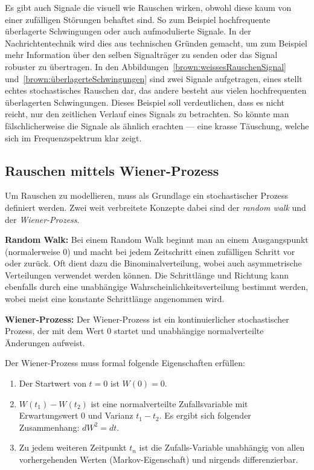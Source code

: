 Es gibt auch Signale die visuell wie Rauschen wirken, obwohl diese kaum von einer zufälligen Störungen behaftet sind. So zum Beispiel hochfrequente überlagerte Schwingungen oder auch aufmodulierte Signale. In der Nachrichtentechnik wird dies aus technischen Gründen gemacht, um zum Beispiel mehr Information über den selben Signalträger zu senden oder das Signal robuster zu übertragen. In den Abbildungen~\ref{brown:weissesRauschenSignal} und~\ref{brown:überlagerteSchwingungen} sind zwei Signale aufgetragen, eines stellt echtes stochastisches Rauschen dar, das andere besteht aus vielen hochfrequenten überlagerten Schwingungen. Dieses Beispiel soll verdeutlichen, dass es nicht reicht, nur den zeitlichen Verlauf eines Signals zu betrachten. So könnte man fälschlicherweise die Signale als ähnlich erachten --- eine krasse Täuschung, welche sich im Frequenzspektrum klar zeigt. 



\subsection{Rauschen mittels Wiener-Prozess\label{brown:Rauschen:RandomWalkWiener}}

Um Rauschen zu modellieren, muss als Grundlage ein stochastischer Prozess definiert werden. Zwei weit verbreitete Konzepte dabei sind der \textit{random walk} und der \textit{Wiener-Prozess}.

\begin{definition}\textbf{Random Walk:}
	\label{randomWalk}
	Bei einem Random Walk beginnt man an einem Ausgangspunkt (normalerweise 0) und macht bei jedem Zeitschritt einen zufälligen Schritt vor oder zurück. Oft dient dazu die Binominalverteilung, wobei auch asymmetrische Verteilungen verwendet werden können. Die Schrittlänge und Richtung kann ebenfalls durch eine unabhängige Wahrscheinlichkeitsverteilung bestimmt werden, wobei meist eine konstante Schrittlänge angenommen wird.
\end{definition}

\begin{definition}\textbf{Wiener-Prozess:}
	\label{wienerprozess}
	Der Wiener-Prozess ist ein kontinuierlicher stochastischer Prozess, der mit dem Wert 0 startet und unabhängige normalverteilte Änderungen aufweist.
	
	Der Wiener-Prozess muss formal folgende Eigenschaften erfüllen: 
	
	\begin{enumerate}
		\item Der Startwert von $ t = 0 $ ist $ W(0) = 0 $.
		\item $ W(t_{1}) - W(t_{2}) $ ist eine normalverteilte Zufallsvariable mit Erwartungswert 0 und Varianz $ t_{1} - t_{2} $. Es ergibt sich folgender Zusammenhang: $ dW^2 = dt $.
		\item Zu jedem weiteren Zeitpunkt $ t_{n} $ ist die Zufalls-Variable unabhängig von allen vorhergehenden Werten (Markov-Eigenschaft) und nirgends differenzierbar.
	\end{enumerate}
\end{definition}

